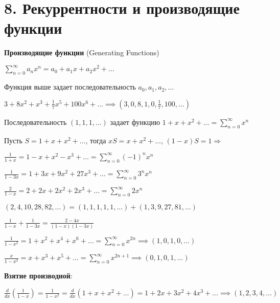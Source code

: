 \documentclass[12pt]{article}
\begin{document}
    \clearpage


    \section{8. Рекуррентности и производящие функции}

    \item \textbf{Производящие функции} (Generating Functions)

    $\displaystyle \sum_{n = 0}^\infty a_n x^n = a_0 + a_1 x + a_2 x^2 + \dots$

    Функция выше задает последовательность $\displaystyle a_0, a_1, a_2, \dots$

    \Ex $\displaystyle 3 + 8x^2 + x^3 + \frac{1}{7}x^5 + 100x^6 + \dots \implies (3, 0, 8, 1, 0, \frac{1}{7}, 100, \dots)$

    \Ex Последовательность $(1, 1, 1, \dots)$ задает функцию $\displaystyle 1 + x + x^2 + \dots = \sum_{n = 0}^\infty x^n$

    Пусть $\displaystyle S = 1 + x + x^2 + \dots$, тогда $\displaystyle xS = x + x^2 + \dots$, $(1 - x) S = 1 \Longrightarrow $


    \Ex

    $\displaystyle \frac{1}{1 + x} = 1 - x + x^2 - x^3 + \dots = \sum_{n = 0}^\infty (-1)^n x^n$

    $\displaystyle \frac{1}{1 - 3x} = 1 + 3x + 9x^2 + 27x^3 + \dots = \sum_{n = 0}^\infty 3^n x^n$

    $\displaystyle \frac{2}{1 - x} = 2 + 2x + 2x^2 + 2x^3 + \dots = \sum_{n = 0}^\infty 2 x^n$

    $(2, 4, 10, 28, 82, \dots) = (1, 1, 1, 1, 1, \dots) + (1, 3, 9, 27, 81, \dots)$

    $\displaystyle \frac{1}{1 - x} + \frac{1}{1 - 3x} = \frac{2 - 4x}{(1 - x)(1 - 3x)}$

    $\displaystyle \frac{1}{1 - x^2} = 1 + x^2 + x^4 + x^6 + \dots = \sum_{n = 0}^\infty x^{2n} \implies (1, 0, 1, 0, \dots)$

    $\displaystyle \frac{x}{1 - x^2} = x + x^3 + x^5 + \dots = \sum_{n = 0}^\infty x^{2n + 1} \implies (0, 1, 0, 1, \dots)$

    \textbf{Взятие производной}:

    $\displaystyle \frac{d}{dx} (\frac{1}{1 - x}) = \frac{1}{1 - x^2} = \frac{d}{dx} (1 + x + x^2 + \dots) = 1 + 2x + 3x^2 + 4x^3 + \dots \implies (1, 2, 3, 4, \dots)$
\end{document}
